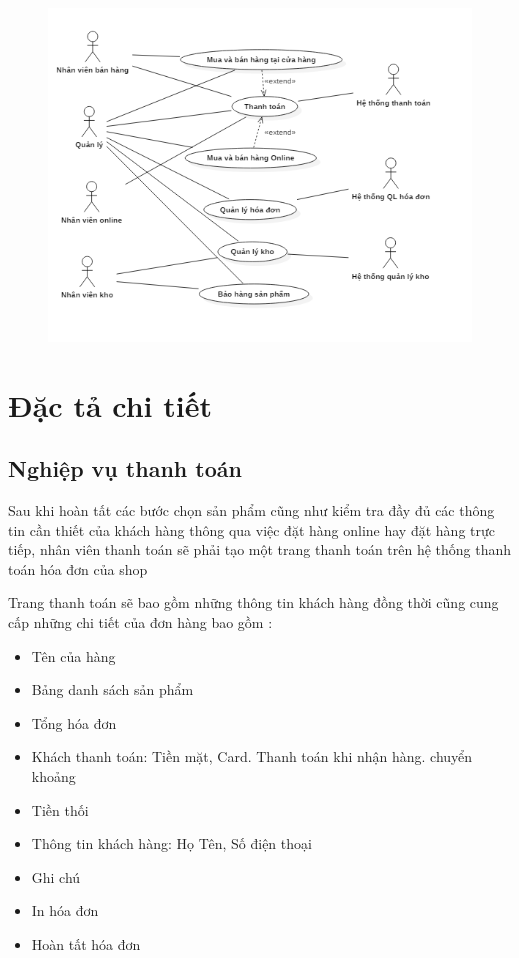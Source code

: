 \documentclass{article}
\begin{document}
\begin{figure}[htp]
    \centering
    \includegraphics{3.png}
\end{figure}
\pagebreak

\fontsize{16}{20}\selectfont\section{Đặc tả chi tiết}
\fontsize{14}{20}\selectfont\subsection{Nghiệp vụ thanh toán}
Sau khi hoàn tất các bước chọn sản phẩm cũng như kiểm tra đầy đủ các thông tin cần thiết của khách hàng thông qua việc đặt hàng online hay đặt hàng trực tiếp, nhân viên thanh toán sẽ phải tạo một trang thanh toán trên hệ thống thanh toán hóa đơn của shop 

Trang thanh toán sẽ bao gồm những thông tin khách hàng đồng thời cũng cung cấp những chi tiết của đơn hàng bao gồm : 

\begin{itemize}
    \item Tên của hàng
    \item Bảng danh sách sản phẩm
    \item Tổng hóa đơn
    \item Khách thanh toán: Tiền mặt, Card. Thanh toán khi nhận hàng. chuyển khoảng
    \item Tiền thối
    \item Thông tin khách hàng: Họ Tên, Số điện thoại
    \item Ghi chú
    \item In hóa đơn
    \item Hoàn tất hóa đơn
\end{itemize}
\end{document}
